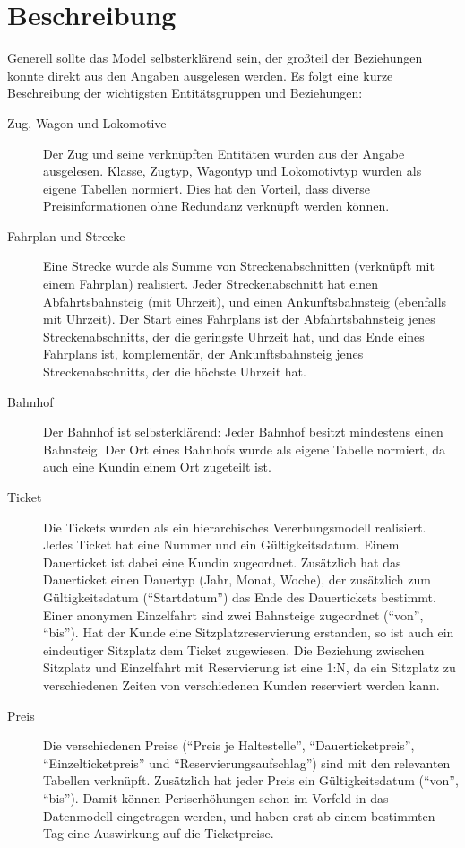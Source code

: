 \section{Beschreibung}
\label{section:Beschreibung}

Generell sollte das Model selbsterklärend sein, der großteil der Beziehungen konnte direkt aus den Angaben ausgelesen werden. 
Es folgt eine kurze Beschreibung der wichtigsten Entitätsgruppen und Beziehungen:

\begin{description}
    \item[Zug, Wagon und Lokomotive] Der Zug und seine verknüpften Entitäten wurden aus der Angabe ausgelesen. 
    Klasse, Zugtyp, Wagontyp und Lokomotivtyp wurden als eigene Tabellen normiert. 
    Dies hat den Vorteil, dass diverse Preisinformationen ohne Redundanz verknüpft werden können.
    \item[Fahrplan und Strecke] Eine Strecke wurde als Summe von Streckenabschnitten (verknüpft mit einem Fahrplan) realisiert.
    Jeder Streckenabschnitt hat einen Abfahrtsbahnsteig (mit Uhrzeit), und einen Ankunftsbahnsteig (ebenfalls mit Uhrzeit). 
    Der Start eines Fahrplans ist der Abfahrtsbahnsteig jenes Streckenabschnitts, der die geringste Uhrzeit hat, 
    und das Ende eines Fahrplans ist, komplementär, der Ankunftsbahnsteig jenes Streckenabschnitts, der die höchste Uhrzeit hat.
    \item[Bahnhof] Der Bahnhof ist selbsterklärend: Jeder Bahnhof besitzt mindestens einen Bahnsteig. 
    Der Ort eines Bahnhofs wurde als eigene Tabelle normiert, da auch eine Kundin einem Ort zugeteilt ist.
    \item[Ticket] Die Tickets wurden als ein hierarchisches Vererbungsmodell realisiert. Jedes Ticket hat eine Nummer und ein Gültigkeitsdatum.
    Einem Dauerticket ist dabei eine Kundin zugeordnet. Zusätzlich hat das Dauerticket einen Dauertyp (Jahr, Monat, Woche), 
    der zusätzlich zum Gültigkeitsdatum (``Startdatum'') das Ende des Dauertickets bestimmt.
    Einer anonymen Einzelfahrt sind zwei Bahnsteige zugeordnet (``von'', ``bis'').
    Hat der Kunde eine Sitzplatzreservierung erstanden, so ist auch ein eindeutiger Sitzplatz dem Ticket zugewiesen.
    Die Beziehung zwischen Sitzplatz und Einzelfahrt mit Reservierung ist eine 1:N, da ein Sitzplatz zu verschiedenen Zeiten 
    von verschiedenen Kunden reserviert werden kann.
    \item[Preis] Die verschiedenen Preise (``Preis je Haltestelle'', ``Dauerticketpreis'', ``Einzelticketpreis'' und ``Reservierungsaufschlag'') 
    sind mit den relevanten Tabellen verknüpft. Zusätzlich hat jeder Preis ein Gültigkeitsdatum (``von'', ``bis''). 
    Damit können Periserhöhungen schon im Vorfeld in das Datenmodell eingetragen werden, und haben erst ab einem bestimmten Tag eine Auswirkung auf die Ticketpreise.

\end{description}
